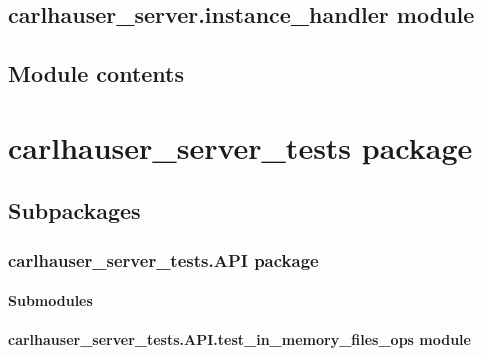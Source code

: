 \documentclass[letterpaper,10pt,english]{sphinxmanual}
\begin{document}
\section{carlhauser\_server.instance\_handler module}
\label{\detokenize{carlhauser_server:carlhauser-server-instance-handler-module}}

\section{Module contents}
\label{\detokenize{carlhauser_server:module-contents}}

\chapter{carlhauser\_server\_tests package}
\label{\detokenize{carlhauser_server_tests:carlhauser-server-tests-package}}\label{\detokenize{carlhauser_server_tests::doc}}

\section{Subpackages}
\label{\detokenize{carlhauser_server_tests:subpackages}}

\subsection{carlhauser\_server\_tests.API package}
\label{\detokenize{carlhauser_server_tests.API:carlhauser-server-tests-api-package}}\label{\detokenize{carlhauser_server_tests.API::doc}}

\subsubsection{Submodules}
\label{\detokenize{carlhauser_server_tests.API:submodules}}

\subsubsection{carlhauser\_server\_tests.API.test\_in\_memory\_files\_ops module}
\label{\detokenize{carlhauser_server_tests.API:module-carlhauser_server_tests.API.test_in_memory_files_ops}}\label{\detokenize{carlhauser_server_tests.API:carlhauser-server-tests-api-test-in-memory-files-ops-module}}
\end{document}
